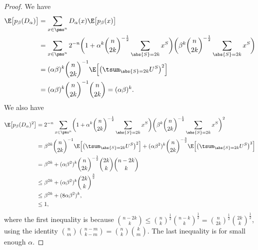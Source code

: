 \begin{proof}
    We have
    \begin{align} \label{eq:OZ-1}
      \E\bigl[p_\beta(D_\alpha)\bigr]
      &= \sum_{x \in \pmo^n} D_\alpha(x) \E \bigl[ p_\beta(x) \bigr] \nonumber \\
      &= \sum_{x \in \pmo^n} 2^{-n} \biggl(1 + \alpha^k \binom{n}{2k}^{-\frac{1}{2}} \sum_{\abs{S}=2k} x^S \biggr) \biggl(  \beta^k \binom{n}{2k}^{-\frac{1}{2}} \sum_{\abs{S}=2k} x^S \biggr) \nonumber \\
      &= (\alpha\beta)^k \binom{n}{2k}^{-1} \E\Bigl[ \bigl(\tsum_{\abs{S}=2k}U^S\bigr)^2 \Bigr] \nonumber \\
      &= (\alpha\beta)^k \binom{n}{2k}^{-1} \binom{n}{2k} 
      = (\alpha\beta)^k .
    \end{align}
    We also have
    \begin{align} \label{eq:OZ-2}
      \E\bigl[p_\beta(D_\alpha)^2\bigr]
      &= 2^{-n} \sum_{x \in \pmo^n} \biggl( 1 + \alpha^k \binom{n}{2k}^{-\frac{1}{2}} \sum_{\abs{S}=2k} x^S \biggr) \biggr( \beta^k \binom{n}{2k}^{-\frac{1}{2}} \sum_{\abs{S}=2k} x^S \biggr)^2 \nonumber \\
      &= \beta^{2k} \binom{n}{2k}^{-1} \E\Bigl[ \bigl(\tsum_{\abs{S}=2k} U^S\bigr)^2 \Bigr] + (\alpha \beta^2)^k \binom{n}{2k}^{-\frac{3}{2}} \E\Bigl[ \bigl(\tsum_{\abs{S}=2k} U^S\bigr)^3\Bigr] \nonumber \\
      &= \beta^{2k} + (\alpha \beta^2)^k \binom{n}{2k}^{-\frac{1}{2}} \binom{2k}{k} \binom{n-2k}{k} \nonumber \\
      &\le \beta^{2k} + (\alpha \beta^2)^k  \binom{2k}{k}^{\frac{3}{2}} \nonumber \\
      &\le \beta^{2k} + (8 \alpha \beta^2)^k ,\nonumber \\
      &\le 1,
    \end{align}
    where the first inequality is because $\binom{n-2k}{k} \le \binom{n}{k}^{\frac{1}{2}} \binom{n-k}{k}^{\frac{1}{2}} = \binom{n}{2k}^{\frac{1}{2}} \binom{2k}{k}^\frac{1}{2}$, using the identity $\binom{n}{m}\binom{n-m}{k-m} = \binom{n}{k}\binom{k}{m}$.  The last inequality is for small enough $\alpha$.


\end{proof}
